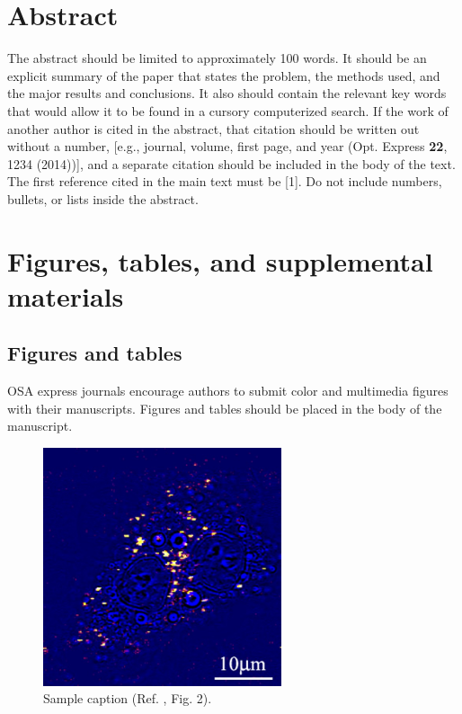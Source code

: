 \documentclass[10pt,letterpaper]{article}
\begin{document}
\section{Abstract}
The abstract should be limited to approximately 100 words. It should be an explicit summary of the paper that states the problem, the methods used, and the major results and conclusions. It also should contain the relevant key words that would allow it to be found in a cursory computerized search. If the work of another author is cited in the abstract, that citation should be written out without a number, [e.g., journal, volume, first page, and year (Opt. Express {\bf 22}, 1234 (2014))], and a separate citation should be included in the body of the text. The first reference cited in the main text must be [1]. Do not include numbers, bullets, or lists inside the abstract.

\section{Figures, tables, and supplemental materials}

\subsection{Figures and tables}

OSA express journals encourage authors to submit color and multimedia figures with their manuscripts. Figures and tables should be placed in the body of the manuscript.

\begin{figure}[h]
\centering\includegraphics[width=7cm]{opexfig1}
\caption{Sample caption (Ref. \cite{Oron03}, Fig. 2).}
\end{figure}
\end{document}
